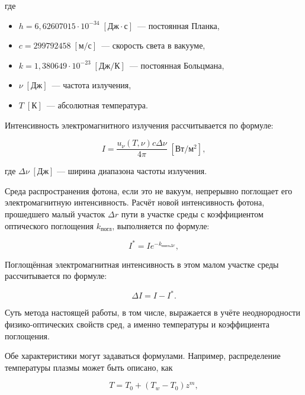 \noindent где
\begin{itemize}
	\item $h = 6,62607015 \cdot 10^{-34} \; \left[\text{Дж}\cdot\text{с}\right]$~— постоянная Планка,
	\item $c = 299792458 \; \left[\text{м}/\text{с}\right]$~— скорость света в вакууме,
	\item $k = 1,380649 \cdot 10^{-23} \; \left[\text{Дж}/\text{К}\right]$~— постоянная Больцмана,
	\item $\nu \; \left[\text{Дж}\right]$~— частота излучения,
	\item $T \; \left[\text{К}\right]$~— абсолютная температура.
\end{itemize}

Интенсивность электромагнитного излучения рассчитывается по формуле:

\begin{equation}
	\label{eqn:intensity-plank}
	I = \frac{u_\nu(T, \nu)c\Delta\nu}{4\pi} \; \left[\text{Вт}/\text{м}^2\right],
\end{equation}

\noindent где $\Delta\nu \; \left[\text{Дж}\right]$ — ширина диапазона частоты излучения.

Среда распространения фотона, если это не вакуум, непрерывно поглощает его электромагнитную интенсивность.
Расчёт новой интенсивность фотона, прошедшего малый участок $\Delta r$ пути в участке среды с коэффициентом оптического поглощения $k_{\text{погл}}$, выполняется по формуле:

\begin{equation}
	\label{eqn:intensity-begin}
	I^* = Ie^{-k_{\text{погл}\Delta r}},
\end{equation}

Поглощённая электромагнитная интенсивность в этом малом участке среды рассчитывается по формуле:

\begin{equation}
	\label{eqn:intensity-end}
	\Delta I = I - I^*.
\end{equation}

Суть метода настоящей работы, в том числе, выражается в учёте неоднородности физико-оптических свойств сред, а именно температуры и коэффициента поглощения.

Обе характеристики могут задаваться формулами.
Например, распределение температуры плазмы может быть описано, как

\begin{equation}
	\label{eqn:xenon-temperature}
	T = T_0 + (T_w - T_0)z^m,
\end{equation}

